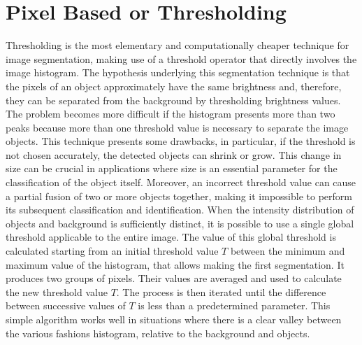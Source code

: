 \documentclass[final,a4paper,12pt,english]{UnicaPhdThesis3}
\begin{document}
\section{Pixel Based or Thresholding} %
Thresholding is the most elementary and computationally cheaper technique for image segmentation, making use of a threshold operator that directly involves the image histogram. The hypothesis underlying this segmentation technique is that the pixels of an object approximately have the same brightness and, therefore, they can be separated from the background by thresholding brightness values. The problem becomes more difficult if the histogram presents more than two peaks because more than one threshold value is necessary to separate the image objects. This technique presents some drawbacks, in particular, if the threshold is not chosen accurately, the detected objects can shrink or grow. This change in size can be crucial in applications where size is an essential parameter for the classification of the object itself.
Moreover, an incorrect threshold value can cause a partial fusion of two or more objects together, making it impossible to perform its subsequent classification and identification. When the intensity distribution of objects and background is sufficiently distinct, it is possible to use a single global threshold \cite{Gonz, GonzMAT} applicable to the entire image. The value of this global threshold is calculated starting from an initial threshold value $T$ between the minimum and maximum value of the histogram, that allows making the first segmentation. It produces two groups of pixels. Their values are averaged and used to calculate the new threshold value $T$. The process is then iterated until the difference between successive values of $T$ is less than a predetermined parameter. This simple algorithm works well in situations where there is a clear valley between the various fashions histogram, relative to the background and objects.
\end{document}
